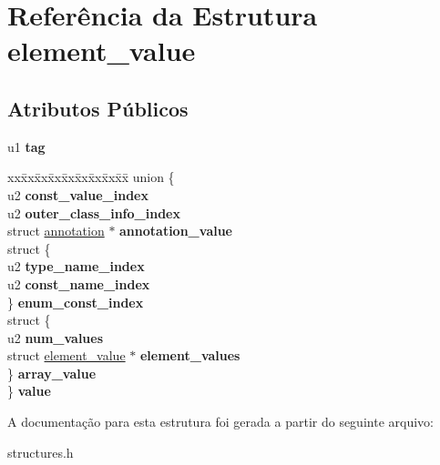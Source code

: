 \hypertarget{structelement__value}{}\section{Referência da Estrutura element\+\_\+value}
\label{structelement__value}
\subsection*{Atributos Públicos}
\begin{DoxyCompactItemize}
\item 
\mbox{\label{structelement__value_a2664460cf3cbd50f7116dcc6fc5dc049}} 
u1 {\bfseries tag}
\item 
\mbox{\label{structelement__value_a4e0b4dd7c57280a3c485e3f5d03bee80}} 
\begin{tabbing}
xx\=xx\=xx\=xx\=xx\=xx\=xx\=xx\=xx\=\kill
union \{\\
\>u2 {\bfseries const\_value\_index}\\
\>u2 {\bfseries outer\_class\_info\_index}\\
\>struct \hyperlink{structannotation}{annotation} $\ast$ {\bfseries annotation\_value}\\
\>struct \{\\
\>\>u2 {\bfseries type\_name\_index}\\
\>\>u2 {\bfseries const\_name\_index}\\
\>\} {\bfseries enum\_const\_index}\\
\>struct \{\\
\>\>u2 {\bfseries num\_values}\\
\>\>struct \hyperlink{structelement__value}{element\_value} $\ast$ {\bfseries element\_values}\\
\>\} {\bfseries array\_value}\\
\} {\bfseries value}\\

\end{tabbing}\end{DoxyCompactItemize}


A documentação para esta estrutura foi gerada a partir do seguinte arquivo\+:\begin{DoxyCompactItemize}
\item 
structures.\+h\end{DoxyCompactItemize}
